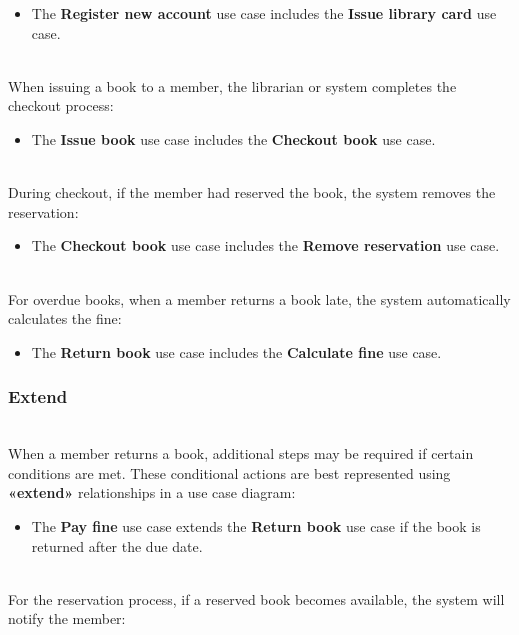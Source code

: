 \begin{itemize}
\item
\protect{}\label{J0j6HamzyMP4hY_dfBzi9}
The \textbf{Register new account} use case includes the \textbf{Issue library card} use case.
\end{itemize}
\\
When issuing a book to a member, the librarian or system completes the checkout process:

\begin{itemize}
\item
\protect{}\label{-cLIMzsQzIFtxcCFaz9_o}
The \textbf{Issue book} use case includes the \textbf{Checkout book} use case.
\end{itemize}
\\
During checkout, if the member had reserved the book, the system removes the reservation:

\begin{itemize}
\item
\protect{}\label{fLZSJh_UKoYoJVSpxdDmc}
The \textbf{Checkout book} use case includes the \textbf{Remove reservation} use case.
\end{itemize}
\\
For overdue books, when a member returns a book late, the system automatically calculates the fine:

\begin{itemize}
\item
\protect{}\label{-7sDUatbnsmdNQEtkQjkJ}
The \textbf{Return book} use case includes the \textbf{Calculate fine} use case.
\end{itemize}

\subsubsection{Extend}\label{efas7YpdDQm-uaHeKwt27}
\\
When a member returns a book, additional steps may be required if certain conditions are met. These conditional actions are best represented using \textbf{«extend»} relationships in a use case diagram:

\begin{itemize}
\item
\protect{}\label{hHJO-Z9YI0oEzwTA60B0N}
The \textbf{Pay fine} use case extends the \textbf{Return book} use case if the book is returned after the due date.
\end{itemize}
\\
For the reservation process, if a reserved book becomes available, the system will notify the member:

